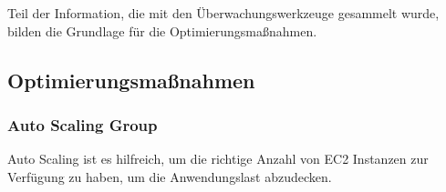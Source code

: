 	
Teil der Information, die mit den Überwachungswerkzeuge gesammelt wurde, bilden die Grundlage für die Optimierungsmaßnahmen.


\subsection{Optimierungsmaßnahmen}

\subsubsection{Auto Scaling Group }
Auto Scaling ist es hilfreich, um die richtige Anzahl von EC2 Instanzen zur Verfügung zu haben, um die Anwendungslast abzudecken.
\\\\

